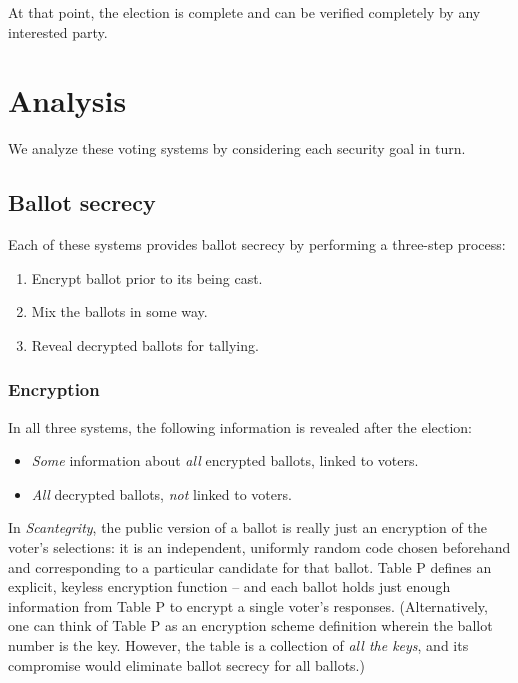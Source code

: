 \documentclass[10pt,twocolumn]{article}
\newcommand{\term}[1]{\textit{#1}}
\begin{document}
At that point, the election is complete and can be verified completely by any interested party.

\section{Analysis}

We analyze these voting systems by considering each security goal in turn.

\subsection{Ballot secrecy}

Each of these systems provides ballot secrecy by performing a three-step process:
\begin{enumerate}
	\item
		Encrypt ballot prior to its being cast.
	\item
		Mix the ballots in some way.
	\item
		Reveal decrypted ballots for tallying.
\end{enumerate}

\subsubsection{Encryption}

In all three systems, the following information is revealed after the election:
\begin{itemize}
	\item
		\emph{Some} information about \emph{all} encrypted ballots, linked to voters.
	\item
		\emph{All} decrypted ballots, \emph{not} linked to voters.
\end{itemize}

In \term{Scantegrity}, the public version of a ballot is really just an encryption of the voter's
selections: it is an independent, uniformly random code chosen beforehand and corresponding to a
particular candidate for that ballot. Table P defines an explicit, keyless encryption
function -- and each ballot holds just enough information from Table P to encrypt a single voter's
responses. (Alternatively, one can think of Table P as an encryption scheme definition wherein the
ballot number is the key. However, the table is a collection of \emph{all the keys}, and its
compromise would eliminate ballot secrecy for all ballots.)
\end{document}
